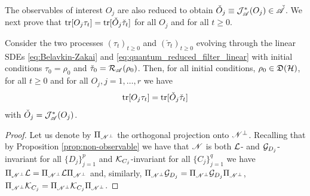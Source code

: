 \documentclass[aihp,12pt]{imsart}
\begin{document}
The observables of interest $O_j$ are also reduced to obtain 
$\check{O}_j\equiv \mathcal{J}_{\mathscr{A}}^*(O_j)\in\check{\mathscr{A}}$. We next prove that ${\rm tr}[O_j\tau_t] = {\rm tr}[\check{O}_j \check{\tau}_t]$ for all $O_j$ and for all $t\geq0$. 
\begin{theorem}
\label{thm:SDE_reduction}
    Consider the two processes $(\tau_t)_{t\geq0}$ and $(\check{\tau}_t)_{t\geq0}$ evolving through the linear SDEs \eqref{eq:Belavkin-Zakai} and \eqref{eq:quantum_reduced_filter_linear} with initial conditions $\tau_0 = \rho_0$ and $\check{\tau}_0 = \mathcal{R}_{\mathscr{A}}(\rho_0)$. 
    Then, for all initial conditions, $\rho_0\in\mathfrak{D}(\mathcal{H})$, for all $t\geq0$ and for all $O_j, j=1,\ldots,r$ we have $${\rm tr}[O_j\tau_t] = {\rm tr}[\check{O}_j \check{\tau}_t]$$ with $\check{O}_j = \mathcal{J}_{\mathscr{A}}^*(O_j)$. 
\end{theorem}
\begin{proof}
    Let us denote by $\Pi_{\mathscr{N}^\perp}$ the orthogonal projection onto $\mathscr{N}^\perp$. 
    Recalling that by Proposition \ref{prop:non-observable} we have that $\mathscr{N}$ is both $\mathcal{L}$- and $\mathcal{G}_{D_j}$-invariant for all $\{D_j\}_{j=1}^p$ and $\mathcal{K}_{C_j}$-invariant for all $\{C_j\}_{j=1}^q$ we have $\Pi_{\mathscr{N}^\perp}  \mathcal{L}  = \Pi_{\mathscr{N}^\perp}  \mathcal{L}  \Pi_{\mathscr{N}^\perp}$ and, similarly, $\Pi_{\mathscr{N}^\perp} \mathcal{G}_{D_j} = \Pi_{\mathscr{N}^\perp}\mathcal{G}_{D_j}\Pi_{\mathscr{N}^\perp}$, $\Pi_{\mathscr{N}^\perp} \mathcal{K}_{C_j} = \Pi_{\mathscr{N}^\perp}\mathcal{K}_{C_j}\Pi_{\mathscr{N}^\perp}$. 


\end{proof}
\end{document}
